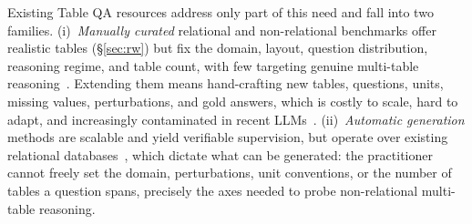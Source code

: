 
Existing Table QA resources address only part of this need and fall into two families. (i)~\emph{Manually curated} relational and non-relational benchmarks offer realistic tables (\S\ref{sec:rw}) but fix the domain, layout, question distribution, reasoning regime, and table count, with few targeting genuine multi-table reasoning~\cite{1.26,1.16}. Extending them means hand-crafting new tables, questions, units, missing values, perturbations, and gold answers, which is costly to scale, hard to adapt, and increasingly contaminated in recent LLMs~\cite{datacontamination}. (ii)~\emph{Automatic generation} methods are scalable and yield verifiable supervision, but operate over existing relational databases~\cite{PapicchioPC23,5.5,5.8}, which dictate what can be generated: the practitioner cannot freely set the domain, perturbations, unit conventions, or the number of tables a question spans, precisely the axes needed to probe non-relational multi-table reasoning.


